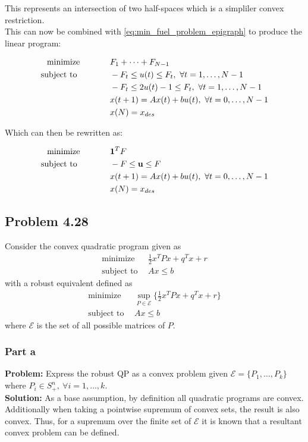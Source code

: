 \documentclass[letter]{article}
\newcommand{\optpblm}[3][eq:default]{
	\begin{equation}\label{#1}
		\begin{aligned}
			\text{minimize} \hspace{0.5in} &#2\vspace{5pt}\\
			\text{subject to \hspace{0.5in}} &#3
		\end{aligned}	
	\end{equation}
}
\begin{document}
This represents an intersection of two half-spaces which is a simpliler convex restriction.\\
This can now be combined with \eqref{eq:min_fuel_problem_epigraph} to produce the linear program:
\optpblm[eq:min_fuel_problem_result]{F_1 + \cdots + F_{N-1}}{
	-F_t \leq u(t) \leq F_t, \ \forall t = 1, \dots, N-1\\
	&-F_t \leq 2u(t) -1 \leq F_t, \ \forall t = 1, \dots, N-1\\
	& x(t+1) = A x(t) + b u(t), \ \forall t = 0,\dots,N-1\\
	&x(N) = x_{des}}
Which can then be rewritten as:
\optpblm[eq:min_fuel_problem_result]{\vb{1}^T F}{
	-F \leq \vb{u} \leq F\\
	& x(t+1) = A x(t) + b u(t), \ \forall t = 0,\dots,N-1\\
	&x(N) = x_{des}
	}

\newpage
\subsection{Problem 4.28}
Consider the convex quadratic program given as
\begin{equation}\label{eq:convex_quadratic_program}
	\begin{aligned}
		\text{minimize} \ \ & \frac{1}{2} x^T P x + q^T x + r\\
		\text{subject to} \ \ & Ax \leq b
	\end{aligned}
\end{equation}
with a robust equivalent defined as
\begin{equation}\label{eq:robust_convex_quadratic_program}
	\begin{aligned}
		\text{minimize} \ \ & \sup_{P\in \mathcal{E}}\{\frac{1}{2} x^T P x + q^T x + r\}\\
		\text{subject to} \ \ & Ax \leq b
	\end{aligned}
\end{equation}
where $\mathcal{E}$ is the set of all possible matrices of $P$.

\subsubsection{Part a}
\textbf{Problem:}
Express the robust QP as a convex problem given $\mathcal{E} = \{P_1,\dots,P_k\}$ where $P_i\in S^n_+, \ \forall i=1,\dots,k$.\\

\textbf{Solution:}
As a base assumption, by definition all quadratic programs are convex. Additionally when taking a pointwise supremum of convex sets, the result is also convex.
Thus, for a supremum over the finite set of $\mathcal{E}$ it is known that a resultant convex problem can be defined.\\
\end{document}
